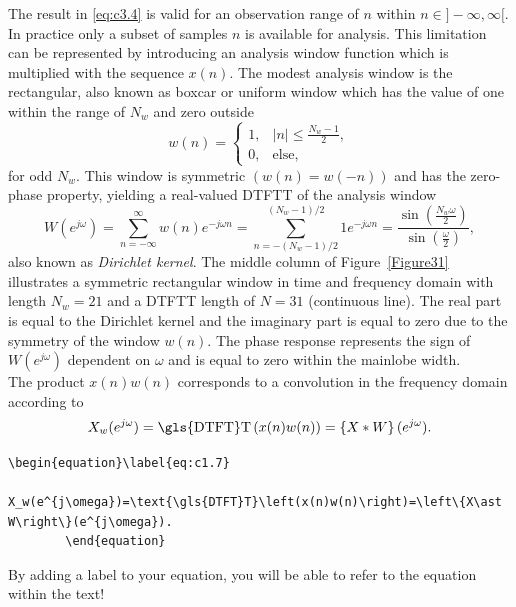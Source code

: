 \noindent The result in \eqref{eq:c3.4} is valid for an observation range of $n$ within $n\in]-\infty,\infty[$. In practice only a subset of samples $n$ is available for analysis. This limitation can be represented by introducing an analysis window function which is multiplied with the sequence $x(n)$. The modest analysis window is the rectangular, also known as boxcar or uniform window which has the value of one within the range of $N_w$ and zero outside
\begin{equation}\label{eq:c3.5}
	w(n)=\begin{cases}1, & |n|\leq\frac{N_w-1}{2},\\
		0, & \text{else},
	\end{cases}
\end{equation}
for odd $N_w$.
This window is symmetric $(w(n)=w(-n))$ and has the zero-phase property, yielding a real-valued \gls{DTFT}T of the analysis window
\begin{equation}\label{eq:c3.6}
	W(e^{j\omega})=\sum_{n=-\infty}^{\infty}w(n)e^{-j\omega n}=\sum_{n=-(N_w-1)/{2}}^{(N_w-1)/{2}}1e^{-j\omega n}=\frac{\sin\left(\frac{N_w\omega}{2}\right)}{\sin\left(\frac{\omega}{2}\right)},
\end{equation}
also known as \textit{Dirichlet kernel}. The middle column of Figure~\ref{Figure31} illustrates a symmetric rectangular window in time and frequency domain with length $N_w=21$ and a \gls{DTFT}T length of $N=31$ (continuous line). The real part is equal to the Dirichlet kernel and the imaginary part is equal to zero due to the symmetry of the window $w(n)$. The phase response represents the sign of $W(e^{j\omega})$ dependent on $\omega$ and is equal to zero within the mainlobe width.\\

\noindent The product $x(n)w(n)$ corresponds to a convolution in the frequency domain according to
\begin{equation}\label{eq:c1.7}
	X_w(e^{j\omega})=\text{\gls{DTFT}T}\left(x(n)w(n)\right)=\left\{X\ast W\right\}(e^{j\omega}).
\end{equation}

\begin{mdframed}
	\begin{lstlisting}[language = Tex, caption={Add formulars to your text}]
		\begin{equation}\label{eq:c1.7}
			X_w(e^{j\omega})=\text{\gls{DTFT}T}\left(x(n)w(n)\right)=\left\{X\ast W\right\}(e^{j\omega}).
		\end{equation}
	\end{lstlisting}
	By adding a label to your equation, you will be able to refer to the equation within the text!
\end{mdframed}

